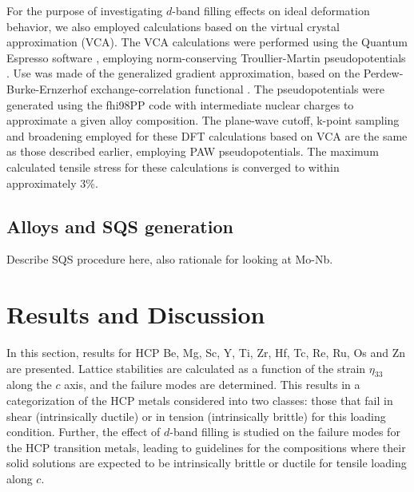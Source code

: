 \documentclass[showpacs,aps,floatfix,prb,reprint,superscriptaddress]{revtex4-1}
\begin{document}
For the purpose of investigating $d$-band filling effects on ideal deformation behavior, we also employed calculations based on the virtual crystal approximation (VCA). The VCA calculations were performed using the Quantum Espresso software \cite{giannozzi2009quantum}, employing norm-conserving Troullier-Martin pseudopotentials \cite{troullier1991efficient,romaner2010effect}. Use was made of the generalized gradient approximation, based on the Perdew-Burke-Ernzerhof exchange-correlation functional \cite{PhysRevLett.77.3865}. The pseudopotentials were generated using the fhi98PP code with intermediate nuclear charges \cite{fuchs1999ab} to approximate a given alloy composition. The plane-wave cutoff, k-point sampling and broadening employed for these DFT calculations based on VCA are the same as those described earlier, employing PAW pseudopotentials. The maximum calculated tensile stress for these calculations is converged to within approximately 3\%.

\subsection{Alloys and SQS generation}
Describe SQS procedure here, also rationale for looking at Mo-Nb.

\section{Results and Discussion}
In this section, results for HCP Be, Mg, Sc, Y, Ti, Zr, Hf, Tc, Re, Ru, Os and Zn are presented. Lattice stabilities are calculated as a function of the strain $\eta_{33}$ along the $c$ axis, and the failure modes are determined. This results in a categorization of the HCP metals considered into two classes: those that fail in shear (intrinsically ductile) or in tension (intrinsically brittle) for this loading condition. Further, the effect of $d$-band filling is studied on the failure modes for the HCP transition metals, leading to guidelines for the compositions where their solid solutions are expected to be intrinsically brittle or ductile for tensile loading along $c$.
\end{document}
